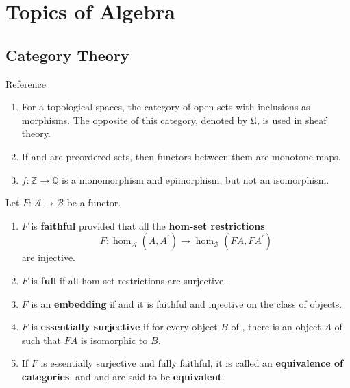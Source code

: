 \part{Topics of Algebra}


\chapter{Category Theory}

Reference \cite{adamekAbstractConcreteCategories,richterCategoriesHomotopyTheory2020} %


\begin{example}
    \begin{enumerate}
        \item For a topological spaces, the category of open sets with inclusions as morphisms. The opposite of this category, denoted by $\mathfrak{U}$, is used in sheaf theory.
        \item If \ca and \cb are preordered sets, then functors between them are monotone maps.
        \item $f: \mathbb{Z} \rightarrow \mathbb{Q}$ is a monomorphism and epimorphism, but not an isomorphism.
    \end{enumerate}
\end{example}


\noindent Let $F: \mathcal{A} \rightarrow \mathcal{B}$ be a functor.
\begin{enumerate}
    \item $F$ is \textbf{faithful} provided that all the \textbf{hom-set restrictions}
    $$
    F: \operatorname{hom}_{\mathcal{A}}\left(A, A^{\prime}\right) \rightarrow \operatorname{hom}_{\mathcal{B}}\left(F A, F A^{\prime}\right)
    $$
    are injective.
    \item $F$ is \textbf{full} if all hom-set restrictions are surjective.
    \item $F$ is an \textbf{embedding} if and it is faithful and injective on the class of objects.
    \item $F$ is \textbf{essentially surjective} if for every object $B$ of \cb, there is an object $A$ of \ca such that $F A$ is isomorphic to $B$. 
    \item If $F$ is essentially surjective and fully faithful, it is called an \textbf{equivalence of categories}, and \ca and \cb are said to be \textbf{equivalent}.
\end{enumerate}

